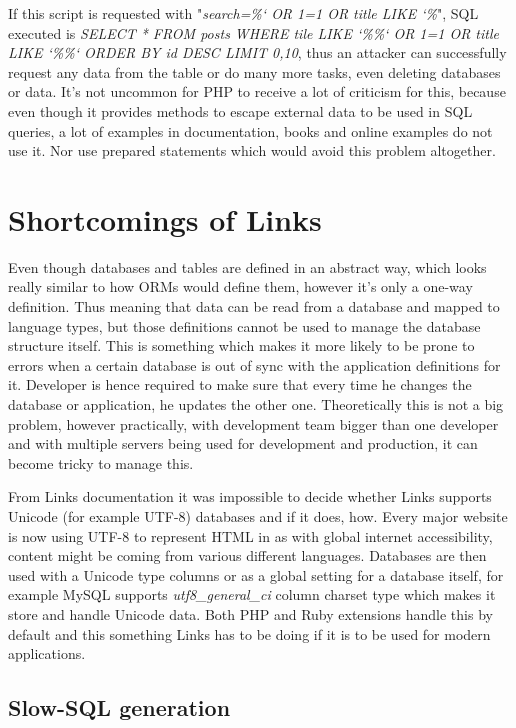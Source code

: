 If this script is requested with "\textit{search=\%` OR 1=1 OR title LIKE `\%}", SQL executed is \textit{SELECT * FROM posts WHERE tile LIKE `\%\%` OR 1=1 OR title LIKE `\%\%` ORDER BY id DESC LIMIT 0,10}, thus an attacker can successfully request any data from the table or do many more tasks, even deleting databases or data. It's not uncommon for PHP to receive a lot of criticism for this, because even though it provides methods to escape external data to be used in SQL queries, a lot of examples in documentation, books and online examples do not use it. Nor use prepared statements which would avoid this problem altogether.

\section{Shortcomings of Links}

Even though databases and tables are defined in an abstract way, which looks really similar to how ORMs would define them, however it's only a one-way definition. Thus meaning that data can be read from a database and mapped to language types, but those definitions cannot be used to manage the database structure itself. This is something which makes it more likely to be prone to errors when a certain database is out of sync with the application definitions for it. Developer is hence required to make sure that every time he changes the database or application, he updates the other one. Theoretically this is not a big problem, however practically, with development team bigger than one developer and with multiple servers being used for development and production, it can become tricky to manage this. 

From Links documentation it was impossible to decide whether Links supports Unicode (for example UTF-8) databases and if it does, how. Every major website is now using UTF-8 to represent HTML in as with global internet accessibility, content might be coming from various different languages. Databases are then used with a Unicode type columns or as a global setting for a database itself, for example MySQL supports \textit{utf8\_general\_ci} column charset type which makes it store and handle Unicode data. Both PHP and Ruby extensions handle this by default and this something Links has to be doing if it is to be used for modern applications.

\subsection{Slow-SQL generation}

